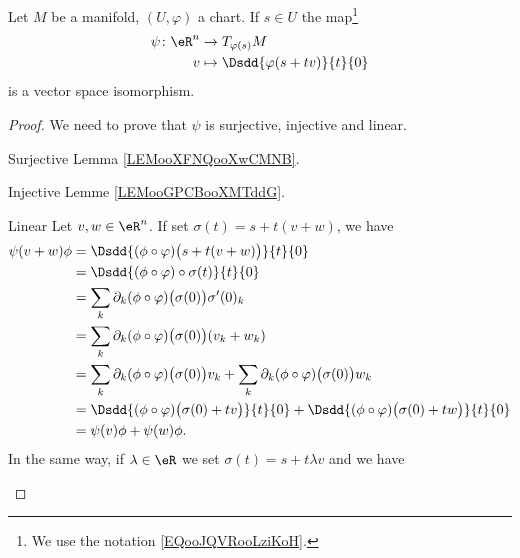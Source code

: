\begin{proposition}     \label{PROPooMEPPooRonxuh}
    Let \( M\) be a manifold, \( (U, \varphi)\) a chart. If \( s\in U\) the map\footnote{We use the notation \eqref{EQooJQVRooLziKoH}.}
    \begin{equation}        \label{EQooJMTJooZNzREy}
        \begin{aligned}
            \psi\colon \eR^n&\to T_{\varphi(s)}M \\
            v&\mapsto \Dsdd{ \varphi(s+tv) }{t}{0} 
        \end{aligned}
    \end{equation}
    is a vector space isomorphism.
\end{proposition}

\begin{proof}
    We need to prove that \( \psi\) is surjective, injective and linear.
    \begin{subproof}
    \item[Surjective] Lemma \ref{LEMooXFNQooXwCMNB}.
    \item[Injective] Lemme \ref{LEMooGPCBooXMTddG}.
    \item[Linear]
        Let \( v,w\in \eR^n\). If set \( \sigma(t)=s+t(v+w)\), we have
        \begin{subequations}
            \begin{align}
                \psi(v+w)\phi&=\Dsdd{ (\phi\circ \varphi)\big( s+t(v+w) \big) }{t}{0}\\
                &=\Dsdd{ (\phi\circ \varphi)\circ \sigma(t) }{t}{0}\\
                &=\sum_k\partial_k(\phi\circ\varphi)\big( \sigma(0) \big)\sigma'(0)_k\\
                &=\sum_k\partial_k(\phi\circ\varphi)\big( \sigma(0) \big)(v_k+w_k)\\
                &=\sum_k\partial_k(\phi\circ\varphi)\big( \sigma(0) \big)v_k+\sum_k\partial_k(\phi\circ\varphi)\big( \sigma(0) \big)w_k\\
                &=\Dsdd{ (\phi\circ\varphi)\big( \sigma(0)+tv \big) }{t}{0}+\Dsdd{ (\phi\circ\varphi)\big( \sigma(0)+tw \big) }{t}{0}\\
                &=\psi(v)\phi+\psi(w)\phi.
            \end{align}
        \end{subequations}
        In the same way, if \( \lambda\in \eR\) we set \( \sigma(t)=s+t\lambda v\) and we have
        \begin{subequations}

\end{subequations}
\end{subproof}
\end{proof}
